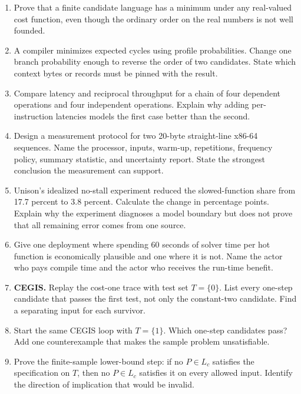 \begin{enumerate}
\item Prove that a finite candidate language has a minimum under any
real-valued cost function, even though the ordinary order on the real numbers
is not well founded.

\item A compiler minimizes expected cycles using profile probabilities.
Change one branch probability enough to reverse the order of two candidates.
State which context bytes or records must be pinned with the result.

\item Compare latency and reciprocal throughput for a chain of four dependent
operations and four independent operations. Explain why adding per-instruction
latencies models the first case better than the second.

\item Design a measurement protocol for two 20-byte straight-line x86-64
sequences. Name the processor, inputs, warm-up, repetitions, frequency policy,
summary statistic, and uncertainty report. State the strongest conclusion the
measurement can support.

\item Unison's idealized no-stall experiment reduced the slowed-function share
from 17.7 percent to 3.8 percent. Calculate the change in percentage points.
Explain why the experiment diagnoses a model boundary but does not prove that
all remaining error comes from one source.

\item Give one deployment where spending 60 seconds of solver time per hot
function is economically plausible and one where it is not. Name the actor
who pays compile time and the actor who receives the run-time benefit.

\item \textbf{CEGIS.} Replay the cost-one trace with test set
\(T=\{0\}\). List every one-step candidate that passes the first test, not only
the constant-two candidate. Find a separating input for each survivor.

\item Start the same CEGIS loop with \(T=\{1\}\). Which one-step candidates
pass? Add one counterexample that makes the sample problem unsatisfiable.

\item Prove the finite-sample lower-bound step: if no \(P\in L_c\) satisfies
the specification on \(T\), then no \(P\in L_c\) satisfies it on every allowed
input. Identify the direction of implication that would be invalid.


\end{enumerate}
